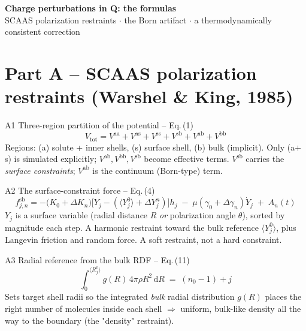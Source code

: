 \documentclass[11pt]{article}
\newcommand{\gap}{\vspace{10pt}}
\newcommand{\eq}[1]{{\large\[#1\]}}
\begin{document}
\begin{center}
{\LARGE\bfseries Charge perturbations in Q: the formulas}\\[2pt]
{\normalsize SCAAS polarization restraints \;$\cdot$\; the Born artifact \;$\cdot$\; a thermodynamically consistent correction}
\end{center}
\vspace{6pt}

\section*{Part A \;--\; SCAAS polarization restraints \textnormal{(Warshel \& King, 1985)}}

\begin{scaas}{A1 \;\textbullet\; Three-region partition of the potential \;--\; Eq.\,(1)}
\eq{V_{\text{tot}} = V^{\mathrm{aa}} + V^{\mathrm{as}} + V^{\mathrm{ss}}
                    + V^{\mathrm{sb}} + V^{\mathrm{ab}} + V^{\mathrm{bb}}}
\small Regions: (a) solute + inner shells, (s) surface shell, (b) bulk (implicit).
Only (a$+$s) is simulated explicitly; $V^{\mathrm{ab}},V^{\mathrm{bb}},V^{\mathrm{sb}}$ become
effective terms. $V^{\mathrm{sb}}$ carries the \emph{surface constraints}; $V^{\mathrm{ab}}$ is
the continuum (Born-type) term.
\end{scaas}
\gap

\begin{scaas}{A2 \;\textbullet\; The surface-constraint force \;--\; Eq.\,(4)}
\eq{f_{j,n}^{\mathrm{sb}} = -\bigl(K_0+\Delta K_n\bigr)\bigl[Y_j-(\langle Y_j^0\rangle+\Delta Y_j^n)\bigr]h_j
   \;-\;\mu(\gamma_0+\Delta\gamma_n)\dot{Y}_j \;+\; A_n(t)}
\small $Y_j$ is a surface variable (radial distance $R$ \emph{or} polarization angle $\theta$),
sorted by magnitude each step. A harmonic restraint toward the bulk reference $\langle Y_j^0\rangle$,
plus Langevin friction and random force. A soft restraint, not a hard constraint.
\end{scaas}
\gap

\begin{scaas}{A3 \;\textbullet\; Radial reference from the bulk RDF \;--\; Eq.\,(11)}
\eq{\int_{0}^{\langle R_j^0\rangle} g(R)\,4\pi\rho R^2\,\mathrm{d}R \;=\; (n_0-1)+j}
\small Sets target shell radii so the integrated \emph{bulk} radial distribution $g(R)$ places the
right number of molecules inside each shell $\Rightarrow$ uniform, bulk-like density all the way to
the boundary (the "density" restraint).
\end{scaas}
\gap
\end{document}
